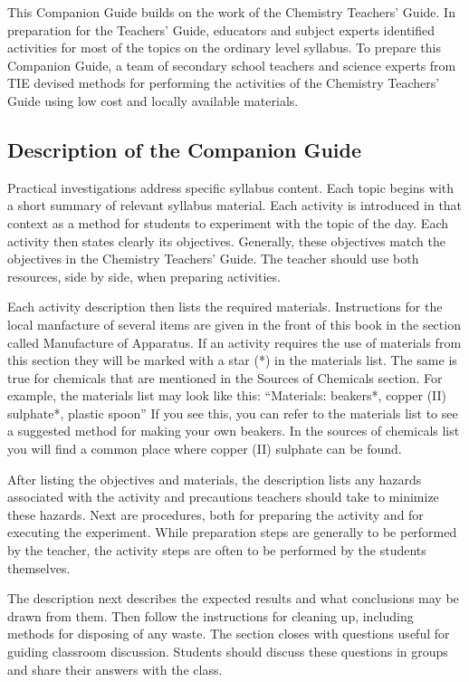 This Companion Guide builds on the work of the Chemistry Teachers' Guide. In preparation for the Teachers' Guide, educators and subject experts identified activities for most of the topics on the ordinary level syllabus. To prepare this Companion Guide, a team of secondary school teachers and science experts from TIE devised methods for performing the activities of the Chemistry Teachers' Guide using low cost and locally available materials.

\subsection*{Description of the Companion Guide}

Practical investigations address specific syllabus content. Each topic begins with a short summary of relevant syllabus material. Each activity is introduced in that context as a method for students to experiment with the topic of the day. Each activity then states clearly its objectives. Generally, these objectives match the objectives in the Chemistry Teachers' Guide. The teacher should use both resources, side by side, when preparing activities.

Each activity description then lists the required materials. Instructions for the local manfacture of several items are given in the front of this book in the section called Manufacture of Apparatus. If an activity requires the use of materials from this section they will be marked with a star (*) in the materials list. The same is true for chemicals that are mentioned in the Sources of Chemicals section. For example, the materials list may look like this:
``Materials: beakers*, copper (II) sulphate*, plastic spoon''
If you see this, you can refer to the materials list to see a suggested method for making your own beakers. In the sources of chemicals list you will find a common place where copper (II) sulphate can be found. 

After listing the objectives and materials, the description lists any hazards associated with the activity and precautions teachers should take to minimize these hazards. Next are procedures, both for preparing the activity and for executing the experiment. While preparation steps are generally to be performed by the teacher, the activity steps are often to be performed by the students themselves.

The description next describes the expected results and what conclusions may be drawn from them. Then follow the instructions for cleaning up, including methods for disposing of any waste. The section closes with questions useful for guiding classroom discussion. Students should discuss these questions in groups and share their answers with the class.

